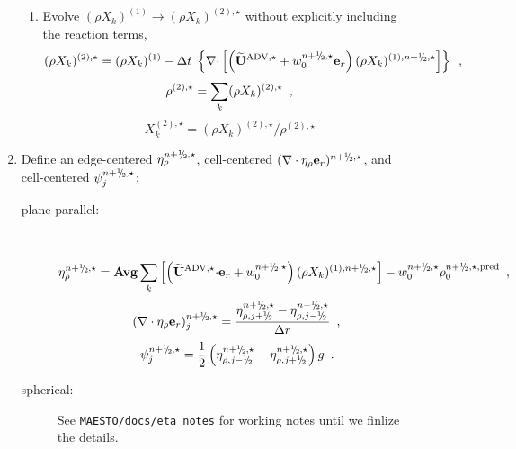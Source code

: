\begin{description}
\begin{enumerate}
\begin{enumerate}
  \item Evolve $(\rho X_k)^{(1)} \rightarrow (\rho X_k)^{(2),\star}$
  without explicitly including the reaction terms,
\begin{equation}
(\rho X_k)^{(2),\star} = (\rho X_k)^{(1)} 
 - \dt \; \left\{ \nablab \cdotb \left[ \left(\uadvone+w_0^{\nph,\star} \er\right)  
  (\rho X_k)^{(1),\nph,\star} \right] \right\} \enskip ,
\end{equation}
\begin{equation}
\rho^{(2),\star} = \sum_k (\rho X_k)^{(2),\star} \enskip ,
\end{equation}
\begin{equation}
X_k^{(2),\star} = (\rho X_k)^{(2),\star} / \rho^{(2),\star}
\end{equation}

\end{enumerate}

\item Define an edge-centered $\etarho^{\nph,\star}$, cell-centered 
$(\nabla\cdot\etarho\er)^{\nph,\star}$, and cell-centered $\psi_j^{\nph,\star}$:

\begin{description}
\item[plane-parallel:]~

\begin{equation}
 \etarho^{\nph,\star} =  {\rm {\bf Avg}} \sum_k \left[ \left(\uadvone \cdotb \er + w_0^{\nph,\star}\right) (\rho X_k)^{(1),\nph,\star} \right] - w_0^{\nph,\star} \rho_0^{\nph,\star,{\rm pred}} \enskip ,
\end{equation}
\begin{equation}
(\nabla\cdot\etarho\er)_j^{\nph,\star} = 
\frac{\eta_{\rho,j+\myhalf}^{\nph,\star}-\eta_{\rho,j-\myhalf}^{\nph,\star}}{\Delta r} \enskip ,
\end{equation}
\begin{equation}
 \psi_j^{\nph,\star} = \frac{1}{2} \left(\eta_{\rho,j-\myhalf}^{\nph,\star} + \eta_{\rho,j+\myhalf}^{\nph,\star}\right) g \enskip .
\end{equation}

\item[spherical:] See {\tt MAESTO/docs/eta\_notes} for working notes until we finlize 
the details.

\end{description}


\end{enumerate}
\end{description}
